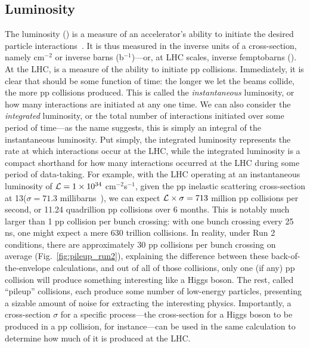 \subsection{Luminosity}
The luminosity (\Lumi) is a measure of an accelerator's ability to initiate the desired particle interactions~\cite{Herr:941318}. 
It is thus measured in the inverse units of a cross-section, namely cm$^{-2}$ or inverse barns (b$^{-1}$)---or, at LHC scales, inverse femptobarns (\fbinv).
At the LHC, \Lumi is a measure of the ability to initiate pp collisions. 
Immediately, it is clear that \Lumi should be some function of time: the longer we let the beams collide, the more pp collisions produced. 
This is called the \textit{instantaneous} luminosity, or how many interactions are initiated at any one time. 
We can also consider the \textit{integrated} luminosity, or the total number of interactions initiated over some period of time---as the name suggests, this is simply an integral of the instantaneous luminosity. 
Put simply, the integrated luminosity represents the rate at which interactions occur at the LHC, while the integrated luminosity is a compact shorthand for how many interactions occurred at the LHC during some period of data-taking. 
For example, with the LHC operating at an instantaneous luminosity of $\mathcal{L} = 1\times10^{34}$ cm$^{-2}$s$^{-1}$, given the pp inelastic scattering cross-section at 13\TeV ($\sigma = 71.3$ millibarns~\cite{CMS-PAS-FSQ-15-005}), we can expect $\mathcal{L}\times\sigma = 713$ million pp collisions per second, or 11.24 quadrillion pp collisions over 6 months. 
This is notably much larger than 1 pp collision per bunch crossing: with one bunch crossing every 25 ns, one might expect a mere 630 trillion collisions. 
In reality, under Run 2 conditions, there are approximately 30 pp collisions per bunch crossing on average (Fig.~\ref{fig:pileup_run2}), explaining the difference between these back-of-the-envelope calculations, and out of all of those collisions, only one (if any) pp collision will produce something interesting like a Higgs boson. 
The rest, called ``pileup'' collisions, each produce some number of low-energy particles, presenting a sizable amount of noise for extracting the interesting physics. 
Importantly, a cross-section $\sigma$ for a specific process---the cross-section for a Higgs boson to be produced in a pp collision, for instance---can be used in the same calculation to determine how much of it is produced at the LHC. 

